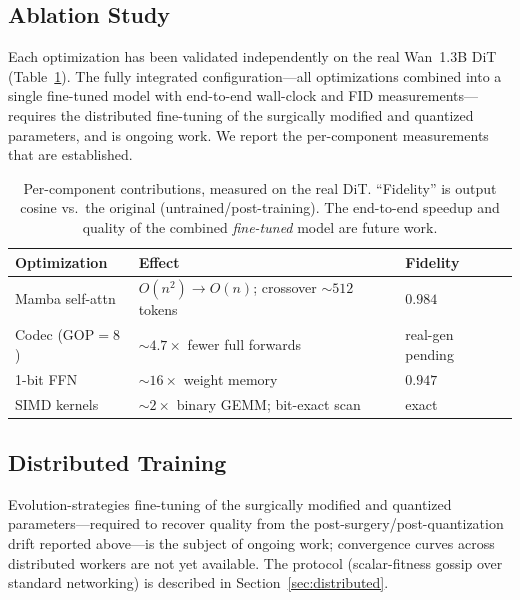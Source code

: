 \documentclass[11pt]{article}
\begin{document}
\subsection{Ablation Study}

Each optimization has been validated independently on the real Wan~1.3B DiT
(Table~\ref{tab:ablation}). The fully integrated configuration---all optimizations
combined into a single fine-tuned model with end-to-end wall-clock and FID
measurements---requires the distributed fine-tuning of the surgically modified
and quantized parameters, and is ongoing work. We report the per-component
measurements that are established.

\begin{table}[h]
\centering
\caption{Per-component contributions, measured on the real DiT. ``Fidelity'' is
output cosine vs.\ the original (untrained/post-training). The end-to-end
speedup and quality of the combined \emph{fine-tuned} model are future work.}
\label{tab:ablation}
\begin{tabular}{@{}lll@{}}
\toprule
Optimization & Effect & Fidelity \\
\midrule
Mamba self-attn & $O(n^2)\!\to\!O(n)$; crossover ${\sim}512$ tokens & $0.984$ \\
Codec (GOP$=8$) & ${\sim}4.7\times$ fewer full forwards & real-gen pending \\
1-bit FFN & ${\sim}16\times$ weight memory & $0.947$ \\
SIMD kernels & ${\sim}2\times$ binary GEMM; bit-exact scan & exact \\
\bottomrule
\end{tabular}
\end{table}

\subsection{Distributed Training}

Evolution-strategies fine-tuning of the surgically modified and quantized
parameters---required to recover quality from the post-surgery/post-quantization
drift reported above---is the subject of ongoing work; convergence curves across
distributed workers are not yet available. The protocol (scalar-fitness gossip
over standard networking) is described in Section~\ref{sec:distributed}.

\end{document}
